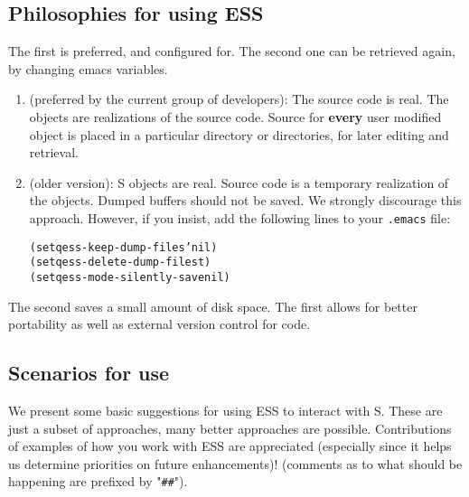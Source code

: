 \documentclass{article}
\newenvironment{Salltt}{\small\begin{alltt}}{\end{alltt}}
\begin{document}
\subsection{Philosophies for using ESS}
\label{sec:S:philosophy}

The first is preferred, and configured for.  The second one can be
retrieved again, by changing emacs variables.

\begin{enumerate}
\item 
  (preferred by the current group of developers):  The source code is 
   real.  The objects are realizations of the source code.  Source
   for \textbf{every} user modified object is placed in a particular directory
   or directories, for later editing and retrieval.

\item (older version): S objects are real.  Source code is a temporary
   realization of the objects.  Dumped buffers should not be saved.
   We strongly discourage this approach.  However, if you insist,
   add the following lines to your \texttt{.emacs} file:\\[-1ex]
   \begin{Salltt}
      (setq ess-keep-dump-files 'nil)
      (setq ess-delete-dump-files t)
      (setq ess-mode-silently-save nil)
   \end{Salltt}

\end{enumerate}
The second saves a small amount of disk space.  The first allows for
better portability as well as external version control for code.

\subsection{Scenarios for use}
\label{sec:S:scenarios}

We present some basic suggestions for using ESS to interact with S.
These are just a subset of approaches, many better approaches are
possible.  Contributions of examples of how you work with ESS are
appreciated (especially since it helps us determine priorities on
future enhancements)! (comments as to what should be happening are
prefixed by "\verb+##+").
\end{document}
